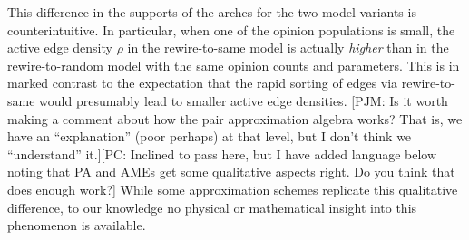 \documentclass[review, onefignum, onetabnum]{siamart171218}
\newcommand{\pjm}[1]{{\color{blue}[PJM: #1]}}
\newcommand{\pc}[1]{{\color{comment_purple}[PC: #1]}}
\begin{document}
		This difference in the supports of the arches for the two model variants is counterintuitive. 
		In particular, when one of the opinion populations is small, the active edge density $\rho$ in the rewire-to-same model is actually \emph{higher} than in the rewire-to-random model with the same opinion counts and parameters.  
		This is in marked contrast to the expectation that the rapid sorting of edges via rewire-to-same would presumably lead to  smaller active edge densities. \pjm{Is it worth making a comment about how the pair approximation algebra works? That is, we have an ``explanation'' (poor perhaps) at that level, but I don't think we ``understand'' it.}\pc{Inclined to pass here, but I have added language below noting that PA and AMEs get some qualitative aspects right. Do you think that does enough work?}
		While some approximation schemes \cite{Durrett2012} replicate this qualitative difference, to our knowledge no physical or mathematical insight into this phenomenon is available. 
\end{document}
